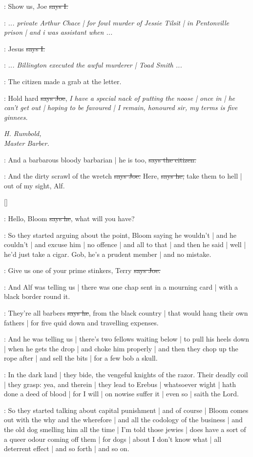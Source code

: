 :
Show us,
Joe
\sout{says I.}

\joe:
\emph{...
private Arthur Chace |
for fowl murder of Jessie Tilsit |
in Pentonville prison |
and i was assistant when ...}

:
Jesus
\sout{says I.}

\joe:
\emph{...
Billington executed the awful murderer |
Toad Smith ...}

\Nq:
The citizen made a grab at the letter.

\joe:
Hold hard
\sout{says Joe},
\emph{I have a special nack of putting the noose |
once in |
he can't get out |
hoping to be favoured |
I remain,
honoured sir,
my terms is five ginnees.}

\emph{%
H. Rumbold, \\
Master Barber.}

\citizen:
And a barbarous bloody barbarian |
he is too,
\sout{says the citizen.}

\joe:
And the dirty scrawl of the wretch
\sout{says Joe.}
Here,
\sout{says he,}
take them to hell |
out of my sight,
Alf.

[]

\joe:
Hello,
Bloom
\sout{says he},
what will you have?

\Nq:
So they started arguing about the point,
Bloom saying he wouldn't |
and he couldn't |
and excuse him |
no offence |
and all to that |
and then he said |
well |
he'd just take a cigar.
Gob,
he's a prudent member |
and no mistake.

\joe:
Give us one of your prime stinkers,
Terry
\sout{says Joe.}

\Nq:
And Alf was telling us |
there was one chap sent in a mourning card |
with a black border
round it.

\bergan:
They're all barbers
\sout{says he},
from the black country |
that would hang their own fathers |
for five quid down and travelling expenses.

\Nq:
And he was telling us |
there's two fellows waiting below |
to pull his heels down |
when he gets the drop |
and choke him properly |
and then they chop up the rope after |
and sell the bits |
for a few bob a skull.

:
In the dark land |
they bide,
the vengeful knights of the razor.
Their deadly coil |
they grasp:
yea,
and therein |
they lead to Erebus |
whatsoever wight |
hath done a deed of blood |
for I will |
on nowise suffer it |
even so |
saith the Lord.

\Nq:
So they started talking about capital punishment
 |
and of course |
Bloom comes out with the why and the wherefore |
and all the codology of the business |
and the old dog smelling him all the time |
I'm told those jewies |
does have a sort of a queer odour coming off them |
for dogs |
about I don't know what |
all deterrent effect |
and so forth |
and so on.

